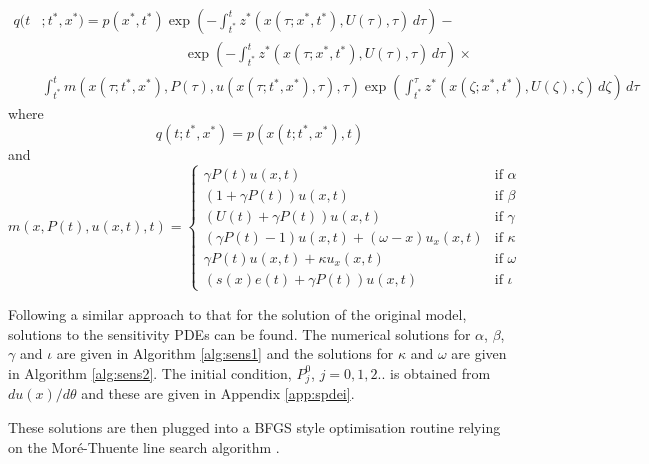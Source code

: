 \documentclass{article}
\begin{document}
\begin{equation}
  \begin{split}
    q(t&;t^*,x^*)=p(x^*,t^*)\exp\left(-\int_{t^*}^t z^*(x(\tau;x^*,t^*),U(\tau),\tau)\,d\tau\right) -\\
    & \phantom{(;t^*,x^*)=p(x^*,t^*)}\exp\left(-\int_{t^*}^t z^*(x(\tau;x^*,t^*),U(\tau),\tau)\,d\tau\right)\times\\
    & \int_{t^*}^t m(x(\tau;t^*,x^*),P(\tau),u(x(\tau;t^*,x^*),\tau),\tau) \exp\left(\int_{t^*}^\tau z^*(x(\zeta;x^*,t^*),U(\zeta),\zeta)\,d\zeta\right)\,d\tau
  \end{split}
\end{equation}
where
\begin{equation}
  q(t;t^*,x^*)=p(x(t;t^*,x^*),t)
\end{equation}
and
\begin{equation}
  m(x,P(t),u(x,t),t)= 
  \begin{cases}
    \gamma P(t) u(x,t) & \text{if } \alpha \\
    \left(1 + \gamma P(t)\right) u(x,t) & \text{if } \beta \\
    \left(U(t) + \gamma P(t)\right) u(x,t) & \text{if } \gamma \\
    \left(\gamma P(t) - 1\right)u(x,t) + (\omega-x) u_x(x,t) & \text{if } \kappa\\
    \gamma P(t) u(x,t) + \kappa u_x(x,t) & \text{if } \omega \\
    \left(s(x)e(t)+\gamma P(t)\right) u(x,t) & \text{if } \iota
  \end{cases}
\end{equation}

Following a similar approach to that for the solution of the original model, solutions to the sensitivity PDEs can be found. %
The numerical solutions for $\alpha$, $\beta$, $\gamma$ and $\iota$ are given in Algorithm \ref{alg:sens1} and the solutions for $\kappa$ and $\omega$ are given in Algorithm \ref{alg:sens2}. The initial condition, $P_j^0$, $j=0,1,2..$ is obtained from $d u(x) / d\theta$ and these are given in Appendix \ref{app:spdei}. 

These solutions are then plugged into a BFGS style optimisation routine relying on the Mor\'{e}-Thuente line search algorithm \citep{more1994lsa}.

\end{document}
